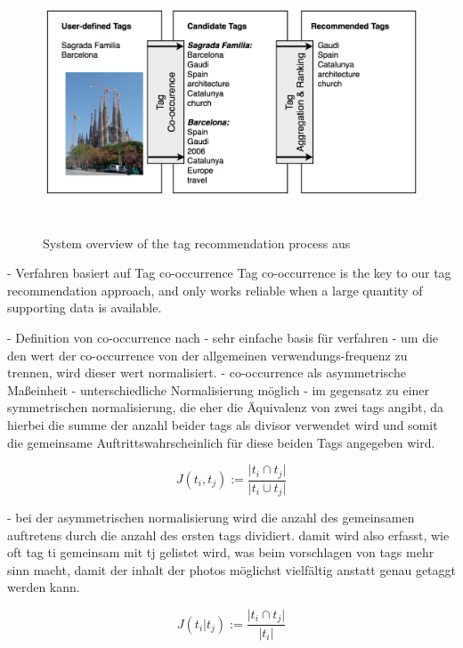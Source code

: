 \begin{figure}[htbp]
  \centering
    \includegraphics[height=3in]{images/collective_knowledge_system_overview.png}
  \caption{System overview of the tag recommendation process aus \cite{collectiveKnowledge}}
  \label{fig:images_collective_knowledge_system_overview}
\end{figure}

 - Verfahren basiert auf Tag co-occurrence
Tag co-occurrence is the key to our tag recommendation approach, and only works reliable when a large quantity of supporting data is available.

 - Definition von co-occurrence nach \cite{collectiveKnowledge}
   - sehr einfache basis für verfahren
 - um die den wert der co-occurrence von der allgemeinen verwendungs-frequenz zu trennen, wird dieser wert normalisiert. 
 - co-occurrence als asymmetrische Maßeinheit
   - unterschiedliche Normalisierung möglich
   - im gegensatz zu einer symmetrischen normalisierung, die eher die Äquivalenz von zwei tags angibt, da hierbei die summe der anzahl beider tags als divisor verwendet wird und somit die gemeinsame Auftrittswahrscheinlich für diese beiden Tags angegeben wird.
\begin{figure}[hptb]
  \begin{equation}
  \label{symmetricNormalization}
   J(t_i, t_j) := \frac{\vert t_i \cap t_j \vert}{ \vert t_i \cup t_j \vert }
  \end{equation}
\end{figure}
   
   - bei der asymmetrischen normalisierung wird die anzahl des gemeinsamen auftretens durch die anzahl des ersten tags dividiert. damit wird also erfasst, wie oft tag ti gemeinsam mit tj gelistet wird, was beim vorschlagen von tags mehr sinn macht, damit der inhalt der photos möglichst vielfältig anstatt genau getaggt werden kann.
\begin{figure}[hptb]
 \begin{equation}
 \label{symmetricNormalization}
  J(t_i \vert t_j) := \frac{\vert t_i \cap t_j \vert}{ \vert t_i \vert }
 \end{equation}
\end{figure}

